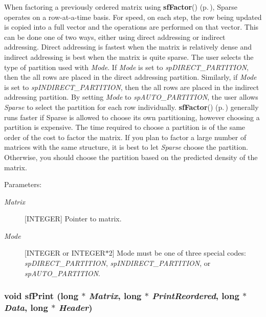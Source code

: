 When factoring a previously ordered matrix using {\bf sf\-Factor}() {\rm (p.\,\pageref{spFortran_8c_a62})}, Sparse operates on a row-at-a-time basis. For speed, on each step, the row being updated is copied into a full vector and the operations are performed on that vector. This can be done one of two ways, either using direct addressing or indirect addressing. Direct addressing is fastest when the matrix is relatively dense and indirect addressing is best when the matrix is quite sparse. The user selects the type of partition used with {\em Mode}. If {\em Mode} is set to {\em sp\-DIRECT\_\-PARTITION}, then the all rows are placed in the direct addressing partition. Similarly, if {\em Mode} is set to {\em sp\-INDIRECT\_\-PARTITION}, then the all rows are placed in the indirect addressing partition. By setting {\em Mode} to {\em sp\-AUTO\_\-PARTITION}, the user allows {\em Sparse} to select the partition for each row individually. {\bf sf\-Factor}() {\rm (p.\,\pageref{spFortran_8c_a62})} generally runs faster if Sparse is allowed to choose its own partitioning, however choosing a partition is expensive. The time required to choose a partition is of the same order of the cost to factor the matrix. If you plan to factor a large number of matrices with the same structure, it is best to let {\em Sparse} choose the partition. Otherwise, you should choose the partition based on the predicted density of the matrix.\begin{Desc}
\item[Parameters: ]\par
\begin{description}
\item[{\em 
Matrix}][INTEGER] Pointer to matrix. \item[{\em 
Mode}][INTEGER or INTEGER$\ast$2] Mode must be one of three special codes: {\em sp\-DIRECT\_\-PARTITION}, {\em sp\-INDIRECT\_\-PARTITION}, or {\em sp\-AUTO\_\-PARTITION}. \end{description}
\end{Desc}
\subsubsection{\setlength{\rightskip}{0pt plus 5cm}void sf\-Print (long $\ast$ {\em Matrix}, long $\ast$ {\em Print\-Reordered}, long $\ast$ {\em Data}, long $\ast$ {\em Header})}\label{spFortran_8c_a66}


